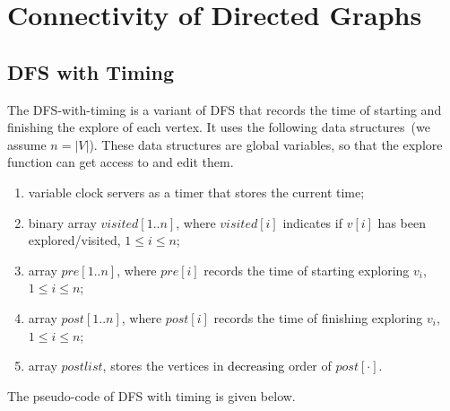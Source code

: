\setcounter{definition}{0} \setcounter{property}{0} \setcounter{claim}{0} \setcounter{fact}{0} \setcounter{corollary}{0} \setcounter{figure}{0}

\section{Connectivity of Directed Graphs}

\subsection*{DFS with Timing}

The DFS-with-timing is a variant of DFS that records the time of starting and finishing the explore
of each vertex. It uses the following data structures~(we assume $n = |V|$).
These data structures are global variables, so that the explore function
can get access to and edit them.

\vspace*{-\topsep}
\begin{enumerate}
\item variable clock servers as a timer that stores the current time;
\item binary array $visited[1..n]$, where $visited[i]$ indicates if $v[i]$ has been explored/visited, $1 \le i \le n$;
\item array $pre[1..n]$, where $pre[i]$ records the time of starting exploring $v_i$, $1 \le i \le n$;
\item array $post[1..n]$, where $post[i]$ records the time of finishing exploring $v_i$, $1 \le i \le n$;
\item array $postlist$, stores the vertices in \textcolor{black}{decreasing} order of $post[\cdot]$.
\end{enumerate}

The pseudo-code of DFS with timing is given below.

\begin{minipage}{0.8\textwidth}
	\xxx
	\xxx
	\xxx
	\xxx
	\xxx
	\xxx
	\xxx
	\xxx
\end{minipage}

